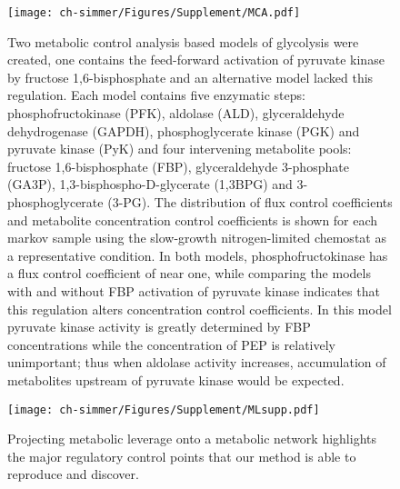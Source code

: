 \begin{figure}[H]
\texttt{[image: ch-simmer/Figures/Supplement/MCA.pdf]}
\caption[Two metabolic control analysis based models of glycolysis were created, one contains the feed-forward activation of pyruvate kinase by fructose 1,6-bisphosphate and an alternative model lacked this regulation]{Two metabolic control analysis based models of glycolysis were created, one contains the feed-forward activation of pyruvate kinase by fructose 1,6-bisphosphate and an alternative model lacked this regulation. Each model contains five enzymatic steps: phosphofructokinase (PFK), aldolase (ALD), glyceraldehyde dehydrogenase (GAPDH), phosphoglycerate kinase (PGK) and pyruvate kinase (PyK) and four intervening metabolite pools: fructose 1,6-bisphosphate (FBP), glyceraldehyde 3-phosphate (GA3P), 1,3-bisphospho-D-glycerate (1,3BPG) and 3-phosphoglycerate (3-PG). The distribution of flux control coefficients and metabolite concentration control coefficients is shown for each markov sample using the slow-growth nitrogen-limited chemostat as a representative condition.  In both models, phosphofructokinase has a flux control coefficient of near one, while comparing the models with and without FBP activation of pyruvate kinase indicates that this regulation alters concentration control coefficients. In this model pyruvate kinase activity is greatly determined by FBP concentrations while the concentration of PEP is relatively unimportant; thus when aldolase activity increases, accumulation of metabolites upstream of pyruvate kinase would be expected.}
\label{fig:MCA}
\end{figure}

\begin{figure}[H]
\texttt{[image: ch-simmer/Figures/Supplement/MLsupp.pdf]}
\caption{Projecting metabolic leverage onto a metabolic network highlights the major regulatory control points that our method is able to reproduce and discover.}
\label{fig:MLpathways}
\end{figure}

